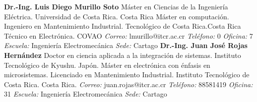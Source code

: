 \documentclass[letterpaper]{article}%
\newenvironment{textoMargen}
    {%
    \begin{list}{}{%
        \setlength{\leftmargin}{3.6cm}%
        \setlength{\rightmargin}{1.1cm}%
    }%
    \item[]%
  }
  {%
    \end{list}%
  }
\begin{document}
\vspace*{-4mm}\begin{textoMargen}\textbf{Dr.{-}Ing. Luis Diego Murillo Soto} \vspace*{2mm} \newline Máster en Ciencias de la Ingeniería Eléctrica. Universidad de Costa Rica. Costa Rica \newline \newline  Máster en computación. Ingeniero en Mantenimiento Industrial. Tecnológico de Costa Rica.Costa Rica \newline \newline  Técnico en Electrónica. COVAO \newline \newline \emph{Correo:} lmurillo@itcr.ac.cr\emph{  Teléfono:} 0 \vspace*{1mm} \newline \emph{  Oficina:} 7\emph{  Escuela:} Ingeniería Electromecánica\emph{  Sede:} Cartago \vspace*{4mm} \newline \textbf{Dr.{-}Ing. Juan José Rojas Hernández} \vspace*{2mm} \newline Doctor en ciencia aplicada a la integración de sistemas. Instituto Tecnológico de Kyushu. Japón. \newline \newline  Máster en electrónica con énfasis en microsistemas. Licenciado en Mantenimiento Industrial. Instituto Tecnológico de Costa Rica. Costa Rica. \newline \newline \emph{Correo:} juan.rojas@itcr.ac.cr\emph{  Teléfono:} 88581419 \vspace*{1mm} \newline \emph{  Oficina:} 31\emph{  Escuela:} Ingeniería Electromecánica\emph{  Sede:} Cartago \vspace*{4mm} \newline \end{textoMargen}%
\end{document}
